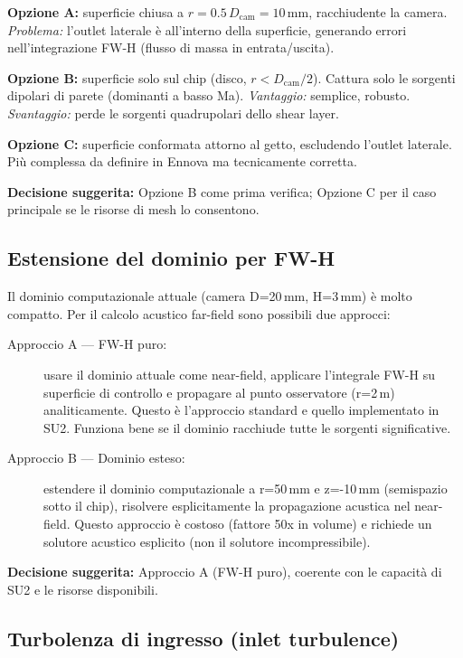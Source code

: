 \documentclass[11pt,a4paper]{article}
\newcommand{\Dcam}{D_{\mathrm{cam}}}
\begin{document}
\textbf{Opzione A:} superficie chiusa a $r = 0.5\,\Dcam = 10$\,mm, racchiudente la camera. \emph{Problema:} l'outlet laterale è all'interno della superficie, generando errori nell'integrazione FW-H (flusso di massa in entrata/uscita).

\textbf{Opzione B:} superficie solo sul chip (disco, $r < \Dcam/2$). Cattura solo le sorgenti dipolari di parete (dominanti a basso Ma). \emph{Vantaggio:} semplice, robusto. \emph{Svantaggio:} perde le sorgenti quadrupolari dello shear layer.

\textbf{Opzione C:} superficie conformata attorno al getto, escludendo l'outlet laterale. Più complessa da definire in Ennova ma tecnicamente corretta.

\textbf{Decisione suggerita:} Opzione B come prima verifica; Opzione C per il caso principale se le risorse di mesh lo consentono.

\subsection{Estensione del dominio per FW-H}

Il dominio computazionale attuale (camera D=20\,mm, H=3\,mm) è molto compatto. Per il calcolo acustico far-field sono possibili due approcci:

\begin{description}
  \item[Approccio A — FW-H puro:] usare il dominio attuale come near-field, applicare l'integrale FW-H su superficie di controllo e propagare al punto osservatore (r=2\,m) analiticamente. Questo è l'approccio standard e quello implementato in SU2. Funziona bene se il dominio racchiude tutte le sorgenti significative.
  \item[Approccio B — Dominio esteso:] estendere il dominio computazionale a r=50\,mm e z=-10\,mm (semispazio sotto il chip), risolvere esplicitamente la propagazione acustica nel near-field. Questo approccio è costoso (fattore 50x in volume) e richiede un solutore acustico esplicito (non il solutore incompressibile).
\end{description}

\textbf{Decisione suggerita:} Approccio A (FW-H puro), coerente con le capacità di SU2 e le risorse disponibili.

\subsection{Turbolenza di ingresso (inlet turbulence)}
\end{document}
